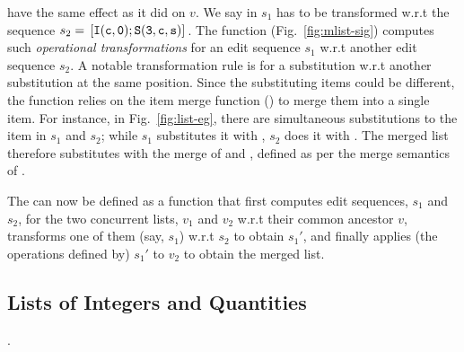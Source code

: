 \begin{itemize}
		have the same effect as it did on $v$. We say  in $s_1$ has to be
		transformed w.r.t the sequence $s_2 = \,{\tt [I(c,0);S(3,c,s)]}\,$.  The function
		 (Fig.~\ref{fig:mlist-sig}) computes such
		\emph{operational transformations} for an edit sequence $s_1$ w.r.t another
		edit sequence $s_2$. A notable transformation rule is for a substitution
		w.r.t another substitution at the same position. Since the substituting
		items could be different, the function relies on the item merge function
		() to merge them into a single item. For instance, in
		Fig.~\ref{fig:list-eg}, there are simultaneous substitutions to the item
		 in $s_1$ and $s_2$; while $s_1$ substitutes it with , $s_2$ does
		it with . The merged list therefore substitutes  with the merge
		of  and , defined as per the merge semantics of .
\end{itemize}
The  can now be defined as a function that first
computes edit sequences, $s_1$ and $s_2$, for the two concurrent
lists, $v_1$ and $v_2$ w.r.t their common ancestor $v$, transforms one
of them (say, $s_1$) w.r.t $s_2$ to obtain $s_1'$, and finally applies
(the operations defined by) $s_1'$ to $v_2$ to obtain the merged list.

\subsection{Lists of Integers and Quantities}. 

